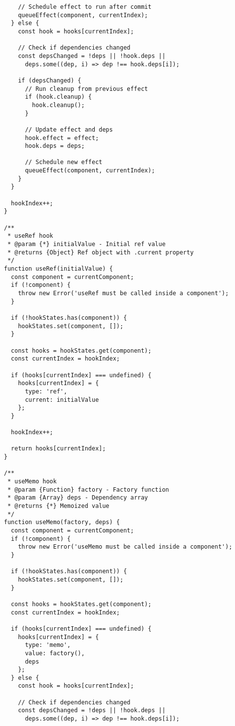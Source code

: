 \documentclass[11pt]{article}
\begin{document}
\begin{verbatim}
    // Schedule effect to run after commit
    queueEffect(component, currentIndex);
  } else {
    const hook = hooks[currentIndex];
    
    // Check if dependencies changed
    const depsChanged = !deps || !hook.deps || 
      deps.some((dep, i) => dep !== hook.deps[i]);
    
    if (depsChanged) {
      // Run cleanup from previous effect
      if (hook.cleanup) {
        hook.cleanup();
      }
      
      // Update effect and deps
      hook.effect = effect;
      hook.deps = deps;
      
      // Schedule new effect
      queueEffect(component, currentIndex);
    }
  }
  
  hookIndex++;
}

/**
 * useRef hook
 * @param {*} initialValue - Initial ref value
 * @returns {Object} Ref object with .current property
 */
function useRef(initialValue) {
  const component = currentComponent;
  if (!component) {
    throw new Error('useRef must be called inside a component');
  }
  
  if (!hookStates.has(component)) {
    hookStates.set(component, []);
  }
  
  const hooks = hookStates.get(component);
  const currentIndex = hookIndex;
  
  if (hooks[currentIndex] === undefined) {
    hooks[currentIndex] = {
      type: 'ref',
      current: initialValue
    };
  }
  
  hookIndex++;
  
  return hooks[currentIndex];
}

/**
 * useMemo hook
 * @param {Function} factory - Factory function
 * @param {Array} deps - Dependency array
 * @returns {*} Memoized value
 */
function useMemo(factory, deps) {
  const component = currentComponent;
  if (!component) {
    throw new Error('useMemo must be called inside a component');
  }
  
  if (!hookStates.has(component)) {
    hookStates.set(component, []);
  }
  
  const hooks = hookStates.get(component);
  const currentIndex = hookIndex;
  
  if (hooks[currentIndex] === undefined) {
    hooks[currentIndex] = {
      type: 'memo',
      value: factory(),
      deps
    };
  } else {
    const hook = hooks[currentIndex];
    
    // Check if dependencies changed
    const depsChanged = !deps || !hook.deps || 
      deps.some((dep, i) => dep !== hook.deps[i]);
    

\end{verbatim}
\end{document}
